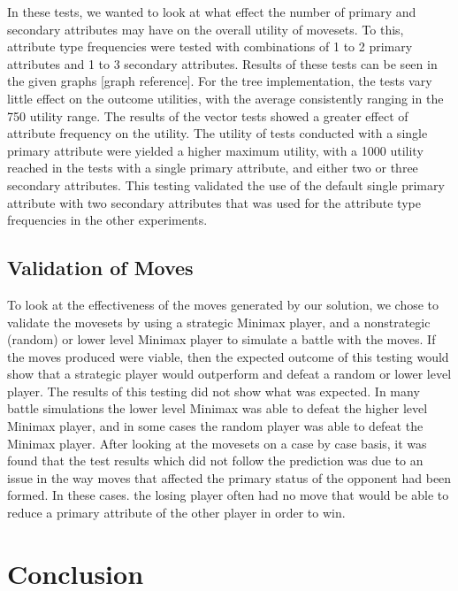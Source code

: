 \documentclass{acm_proc_article-sp}
\begin{document}
In these tests, we wanted to look at what effect the number of primary and secondary attributes may have on the overall utility of movesets. To this, attribute type frequencies were tested with combinations of 1 to 2 primary attributes and 1 to 3 secondary attributes. Results of these tests can be seen in the given graphs [graph reference]. For the tree implementation, the tests vary little effect on the outcome utilities, with the average consistently ranging in the 750 utility range. The results of the vector tests showed a greater effect of attribute frequency on the utility. The utility of tests conducted with a single primary attribute were yielded a higher maximum utility, with a 1000 utility reached in the tests with a single primary attribute, and either two or three secondary attributes. This testing validated the use of the default single primary attribute with two secondary attributes that was used for the attribute type frequencies in the other experiments.
    
    \subsection{Validation of Moves}

To look at the effectiveness of the moves generated by our solution, we chose to validate the movesets by using a strategic Minimax player, and a nonstrategic (random) or lower level Minimax player to simulate a battle with the moves. If the moves produced were viable, then the expected outcome of this testing would show that a strategic player would outperform and defeat a random or lower level player.
The results of this testing did not show what was expected. In many battle simulations the lower level Minimax was able to defeat the higher level Minimax player, and in some cases the random player was able to defeat the Minimax player. After looking at the movesets on a case by case basis, it was found that the test results which did not follow the prediction was due to an issue in the way moves that affected the primary status of the opponent had been formed. In these cases. the losing player often had no move that would be able to reduce a primary attribute of the other player in order to win.
    
    \section{Conclusion}
\end{document}

